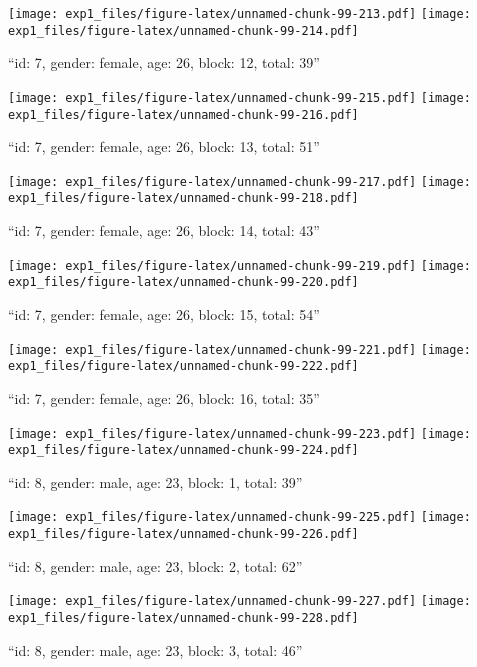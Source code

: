 \documentclass[,]{article}
\begin{document}
\texttt{[image: exp1\_files/figure-latex/unnamed-chunk-99-213.pdf]}
\texttt{[image: exp1\_files/figure-latex/unnamed-chunk-99-214.pdf]}

\newpage
[1] 

``id: 7, gender: female, age: 26, block: 12, total: 39''

\texttt{[image: exp1\_files/figure-latex/unnamed-chunk-99-215.pdf]}
\texttt{[image: exp1\_files/figure-latex/unnamed-chunk-99-216.pdf]}

\newpage
[1] 

``id: 7, gender: female, age: 26, block: 13, total: 51''

\texttt{[image: exp1\_files/figure-latex/unnamed-chunk-99-217.pdf]}
\texttt{[image: exp1\_files/figure-latex/unnamed-chunk-99-218.pdf]}

\newpage
[1] 

``id: 7, gender: female, age: 26, block: 14, total: 43''

\texttt{[image: exp1\_files/figure-latex/unnamed-chunk-99-219.pdf]}
\texttt{[image: exp1\_files/figure-latex/unnamed-chunk-99-220.pdf]}

\newpage
[1] 

``id: 7, gender: female, age: 26, block: 15, total: 54''

\texttt{[image: exp1\_files/figure-latex/unnamed-chunk-99-221.pdf]}
\texttt{[image: exp1\_files/figure-latex/unnamed-chunk-99-222.pdf]}

\newpage
[1] 

``id: 7, gender: female, age: 26, block: 16, total: 35''

\texttt{[image: exp1\_files/figure-latex/unnamed-chunk-99-223.pdf]}
\texttt{[image: exp1\_files/figure-latex/unnamed-chunk-99-224.pdf]}

\newpage
[1] 

``id: 8, gender: male, age: 23, block: 1, total: 39''

\texttt{[image: exp1\_files/figure-latex/unnamed-chunk-99-225.pdf]}
\texttt{[image: exp1\_files/figure-latex/unnamed-chunk-99-226.pdf]}

\newpage
[1] 

``id: 8, gender: male, age: 23, block: 2, total: 62''

\texttt{[image: exp1\_files/figure-latex/unnamed-chunk-99-227.pdf]}
\texttt{[image: exp1\_files/figure-latex/unnamed-chunk-99-228.pdf]}

\newpage
[1] 

``id: 8, gender: male, age: 23, block: 3, total: 46''
\end{document}
